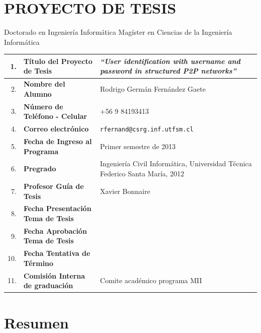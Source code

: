 \documentclass[12pt,spanish]{article}
\makeatletter
\newcommand{\tnhl}{\tabularnewline\hline}
\newcommand{\nl}{\newline}
\newcommand{\thesis}{\emph{``User identification with username and password in structured P2P networks''}}
\newcommand{\name}{Rodrigo Germán Fernández Gaete}
\newcommand{\tel}{+56 9 84193413}
\newcommand{\email}{\texttt{rfernand@csrg.inf.utfsm.cl}}
\newcommand{\idate}{Primer semestre de 2013}
\newcommand{\prof}{Xavier Bonnaire}
\newcommand{\degree}{Ingeniería Civil Informática,
                     Universidad Técnica Federico Santa María, 2012}
\newcommand{\pdate}{}
\newcommand{\adate}{}
\newcommand{\tdate}{}
\newcommand{\comi}{Comite académico programa MII}
\makeatother
\begin{document}
\section*{PROYECTO DE TESIS}
{\huge \Square} Doctorado en Ingeniería Informática
\nl\nl\noindent
{\huge \XBox} Magíster en Ciencias de la Ingeniería Informática

\begin{center}
\begin{tabular}{|r p{}|p{}|}
\hline
  1. & {\bf Título del Proyecto de Tesis    }  & \thesis  \tnhl
  2. & {\bf Nombre del Alumno               }  & \name    \tnhl
  3. & {\bf Número de Teléfono - Celular    }  & \tel     \tnhl
  4. & {\bf Correo electrónico              }  & \email   \tnhl
  5. & {\bf Fecha de Ingreso al Programa    }  & \idate   \tnhl
  6. & {\bf Pregrado                        }  & \degree  \tnhl
  7. & {\bf Profesor Guía de Tesis          }  & \prof    \tnhl
  8. & {\bf Fecha Presentación Tema de Tesis}  & \pdate   \tnhl
  9. & {\bf Fecha Aprobación Tema de Tesis  }  & \adate   \tnhl
 10. & {\bf Fecha Tentativa de Término      }  & \tdate   \tnhl
 11. & {\bf Comisión Interna de graduación  }  & \comi    \tnhl
\end{tabular}
\end{center}
\vfill
\section{Resumen}

\vfill
\end{document}
